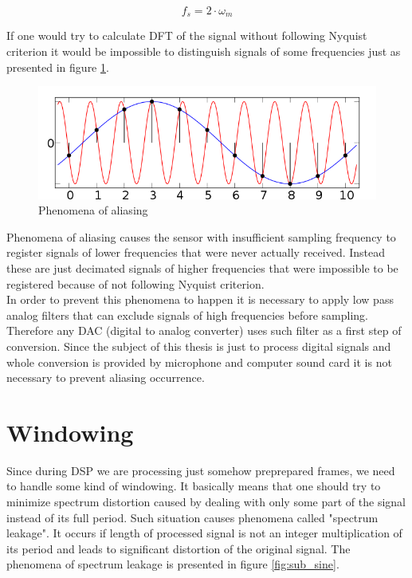 \documentclass[magister]{dyplom}
\begin{document}
	\begin{equation} \label{eq:nyq_criterion}
		f_s = 2 \cdot \omega_m
	\end{equation}
	
	If one would try to calculate \gls{DFT} of the signal without following Nyquist criterion it would be impossible to distinguish signals of some frequencies just as presented in figure \ref{fig:aliasing}. \\
	
	\begin{figure} [!th]
		\centering
		\includegraphics[width=0.7\linewidth]{images/aliasing}
		\caption{Phenomena of aliasing \cite{aliasing_wikipedia}}
		\label{fig:aliasing}
	\end{figure}
	
	Phenomena of aliasing causes the sensor with insufficient sampling frequency to register signals of lower frequencies that were never actually received. Instead these are just decimated signals of higher frequencies that were impossible to be registered because of not following Nyquist criterion.\\
	
	In order to prevent this phenomena to happen it is necessary to apply low pass analog filters that can exclude signals of high frequencies before sampling. Therefore any \gls{DAC} (digital to analog converter) uses such filter as a first step of conversion. Since the subject of this thesis is just to process digital signals and whole conversion is provided by microphone and computer sound card it is not necessary to prevent aliasing occurrence.

	\section{Windowing}
	
	Since during \gls{DSP} we are processing just somehow preprepared frames, we need to handle some kind of windowing. It basically means that one should try to minimize spectrum distortion caused by dealing with only some part of the signal instead of its full period. Such situation causes phenomena called "spectrum leakage". It occurs if length of processed signal is not an integer multiplication of its period and leads to significant distortion of the original signal. The phenomena of spectrum leakage is presented in figure \ref{fig:sub_sine}.
	
\end{document}
